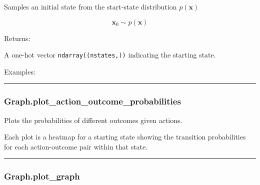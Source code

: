 Samples an initial state from the start-state distribution
\(p(\mathbf x)\)

\[
\mathbf x_0 \sim p(\mathbf x)
\]

Returns:

A one-hot vector \texttt{ndarray((nstates,))} indicating the starting
state.

Examples:

\begin{Shaded}
\begin{Highlighting}[]
\OperatorTok{=}
\end{Highlighting}
\end{Shaded}

\begin{center}\rule{0.5\linewidth}{\linethickness}\end{center}

\hypertarget{graph.plot_action_outcome_probabilities}{%
\subsubsection{Graph.plot\_action\_outcome\_probabilities}\label{graph.plot_action_outcome_probabilities}}

\begin{Shaded}
\begin{Highlighting}[]
\OperatorTok{=}\OperatorTok{=}\OperatorTok{=}\OperatorTok{=}\NormalTok{)}
\end{Highlighting}
\end{Shaded}

Plots the probabilities of different outcomes given actions.

Each plot is a heatmap for a starting state showing the transition
probabilities for each action-outcome pair within that state.

\begin{center}\rule{0.5\linewidth}{\linethickness}\end{center}

\hypertarget{graph.plot_graph}{%
\subsubsection{Graph.plot\_graph}\label{graph.plot_graph}}

